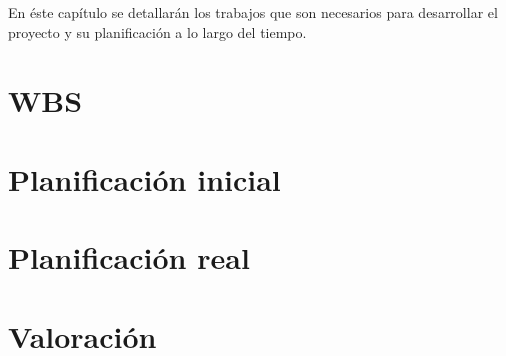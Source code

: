 En éste capítulo se detallarán los trabajos que son necesarios para desarrollar el proyecto y su planificación a lo largo del tiempo.

\section{WBS}
\label{planificacion:wbs}


\section{Planificación inicial}
\label{planificacion:inicial}


\section{Planificación real}
\label{planificacion:real}


\section{Valoración}
\label{planificacion:valoracion}
